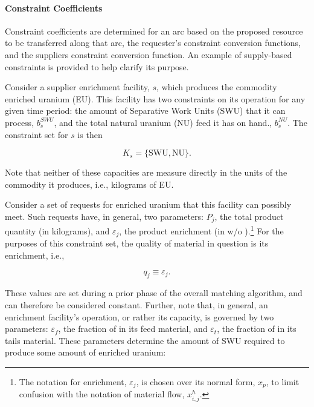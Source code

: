 \paragraph{Constraint Coefficients}

Constraint coefficients are determined for an arc based on the proposed resource
to be transferred along that arc, the requester's constraint conversion
functions, and the suppliers constraint conversion function. An example of
supply-based constraints is provided to help clarify its purpose.

Consider a supplier enrichment facility, $s$, which produces the commodity
enriched uranium (EU). This facility has two constraints on its operation for
any given time period: the amount of Separative Work Units (SWU) that it can
process, $b_{s}^{SWU}$, and the total natural uranium (NU) feed it has on hand.,
$b_{s}^{NU}$. The constraint set for $s$ is then
 
\begin{equation}\label{eqs:enr-constr-commods}
  K_{s} = \{ \mbox{SWU}, \mbox{NU} \}.
\end{equation}

Note that neither of these capacities are measure directly in the units of the
commodity it produces, i.e., kilograms of EU.

Consider a set of requests for enriched uranium that this facility can possibly
meet. Such requests have, in general, two parameters: $P_{j}$, the total product
quantity (in kilograms), and $\varepsilon_{j}$, the product enrichment (in w/o
).\footnote{The notation for enrichment, $\varepsilon_{j}$, is
  chosen over its normal form, $x_p$, to limit confusion with the notation of
  material flow, $x^h_{i,j}$.}  For the purposes of this constraint set, the
quality of material in question is its enrichment, i.e.,

\begin{equation}\label{eqs:enr-q-swu}
  q_{j} \equiv \varepsilon_{j}.
\end{equation}

These values are set during a prior phase of the overall matching algorithm, and
can therefore be considered constant. Further, note that, in general, an
enrichment facility's operation, or rather its capacity, is governed by two
parameters: $\varepsilon_{f}$, the fraction of  in its feed
material, and $\varepsilon_{t}$, the fraction of  in its tails
material. These parameters determine the amount of SWU required to produce some
amount of enriched uranium:

